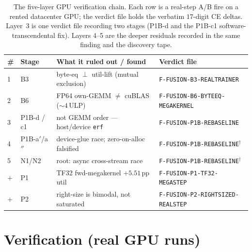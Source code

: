 \documentclass[11pt,a4paper]{article}
\begin{document}
\begin{table}[h]
\centering
\caption{The five-layer GPU verification chain. Each row is a real-step A/B
fire on a rented datacenter GPU; the verdict file holds the verbatim
$17$-digit CE deltas. Layer~3 is one verdict file recording two stages
(P1B-d and the P1B-c1 software-transcendental fix). Layers 4--5 are the
deeper residuals recorded in the same finding and the discovery tape.}
\label{tab:chain}
\small
\begin{tabular}{llll}
\toprule
\# & Stage & What it ruled out / found & Verdict file \\
\midrule
1 & B3 & byte-eq $\perp$ util-lift (mutual exclusion) & \texttt{F-FUSION-B3-REALTRAINER} \\
2 & B6 & FP64 own-GEMM $\neq$ cuBLAS (${\sim}4$\,ULP) & \texttt{F-FUSION-B6-BYTEEQ-MEGAKERNEL} \\
3 & P1B-d / c1 & not GEMM order --- host/device \texttt{erf} & \texttt{F-FUSION-P1B-REBASELINE} \\
4 & P1B-a$'$/a$''$ & device-glue race; zero-on-alloc falsified & \texttt{F-FUSION-P1B-REBASELINE}$^\dagger$ \\
5 & N1/N2 & root: async cross-stream race & \texttt{F-FUSION-P1B-REBASELINE}$^\dagger$ \\
\midrule
+ & P1 & TF32 fwd-megakernel $+5.51$\,pp util & \texttt{F-FUSION-P1-TF32-MEGASTEP} \\
+ & P2 & right-size is bimodal, not saturated & \texttt{F-FUSION-P2-RIGHTSIZED-REALSTEP} \\
\bottomrule
\end{tabular}
\end{table}


\section{Verification (real GPU runs)}
\label{sec:results}
\end{document}
